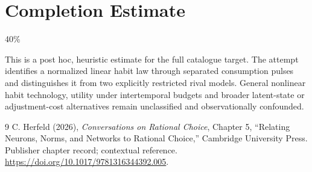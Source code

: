\documentclass[11pt]{article}
\theoremstyle{definition}
\begin{document}
\section{Completion Estimate}
40\%

This is a post hoc, heuristic estimate for the full catalogue target.
The attempt identifies a normalized linear habit law through separated consumption pulses and distinguishes it from two explicitly restricted rival models. General nonlinear habit technology, utility under intertemporal budgets and broader latent-state or adjustment-cost alternatives remain unclassified and observationally confounded.

\begin{thebibliography}{9}
 C. Herfeld (2026), \emph{Conversations on Rational Choice},
Chapter 5, ``Relating Neurons, Norms, and Networks to Rational Choice,''
Cambridge University Press. Publisher chapter record; contextual reference.
\url{https://doi.org/10.1017/9781316344392.005}.
\end{thebibliography}
\end{document}
